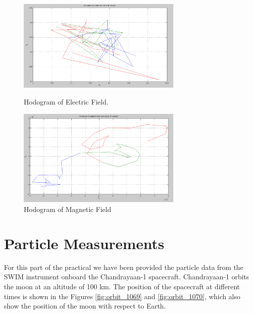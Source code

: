 \documentclass{article}
\begin{document}
\begin{figure}[hbt!]
\begin{minipage}[c]{0.5\linewidth}
\centering
\includegraphics[width=8cm]{Figures/hodogram_electric.png}
\caption{Hodogram of Electric Field.}
\label{fig:hodogram_electric}
\end{minipage}
\hspace{0.1cm}
\begin{minipage}[c]{0.5\linewidth}
\centering
\includegraphics[width=8cm]{Figures/hodogram_magnetic.png}
\caption{Hodogram of Magnetic Field}
\label{fig:hodogram_magnetic}
\end{minipage}
\end{figure}

\clearpage
\section{Particle Measurements}

For this part of the practical we have been provided the particle data from the SWIM
instrument onboard the Chandrayaan-1 spacecraft. Chandrayaan-1 orbits the moon at an altitude of 100 km. The position of the spacecraft at different times is shown in the Figures \ref{fig:orbit_1069} and \ref{fig:orbit_1070}, which also show the position of the moon with respect to Earth.\cite{Stenberg:2012_2b}
\end{document}
